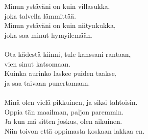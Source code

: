 
Minun ystäväni on kuin villasukka,\\
joka talvella lämmittää.\\
Minun ystäväni on kuin niitynkukka,\\
joka saa minut hymyilemään.\\
\hspace{10mm} \\
Ota kädestä kiinni, tule kanssani rantaan,\\
vien sinut katsomaan.\\
Kuinka aurinko laskee puiden taakse,\\
ja saa taivaan punertamaan.\\
\hspace{10mm} \\
Minä olen vielä pikkuinen, ja siksi tahtoisin.\\
Oppia tän maailman, paljon paremmin.\\
Ja kun mä sitten joskus, olen aikuinen.\\
Niin toivon että oppimasta koskaan lakkaa en.